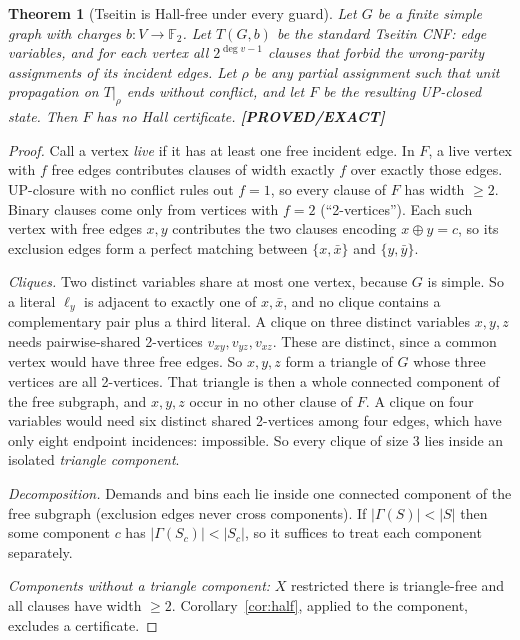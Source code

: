\documentclass[11pt]{article}
\newtheorem{theorem}{Theorem}
\theoremstyle{definition}
\theoremstyle{remark}
\newcommand{\lab}[1]{\textbf{[#1]}}
\newcommand{\F}{\mathbb{F}}
\begin{document}
\begin{theorem}[Tseitin is Hall-free under every guard]\label{thm:tseitin}
Let $G$ be a finite simple graph with charges $b:V\to\F_2$. Let $T(G,b)$ be the standard
Tseitin CNF: edge variables, and for each vertex all $2^{\deg v-1}$ clauses that forbid the
wrong-parity assignments of its incident edges. Let $\rho$ be any partial assignment such that
unit propagation on $T|_\rho$ ends without conflict, and let $F$ be the resulting UP-closed
state. Then $F$ has no Hall certificate. \lab{PROVED/EXACT}
\end{theorem}
\begin{proof}
Call a vertex \emph{live} if it has at least one free incident edge. In $F$, a live vertex with
$f$ free edges contributes clauses of width exactly $f$ over exactly those edges. UP-closure
with no conflict rules out $f=1$, so every clause of $F$ has width $\ge2$. Binary clauses come
only from vertices with $f=2$ (``2-vertices''). Each such vertex with free edges $x,y$
contributes the two clauses encoding $x\oplus y=c$, so its exclusion edges form a perfect
matching between $\{x,\bar x\}$ and $\{y,\bar y\}$.

\emph{Cliques.} Two distinct variables share at most one vertex, because $G$ is simple. So a
literal $\ell_y$ is adjacent to exactly one of $x,\bar x$, and no clique contains a
complementary pair plus a third literal. A clique on three distinct variables $x,y,z$ needs
pairwise-shared 2-vertices $v_{xy},v_{yz},v_{xz}$. These are distinct, since a common vertex
would have three free edges. So $x,y,z$ form a triangle of $G$ whose three vertices are all
2-vertices. That triangle is then a whole connected component of the free subgraph, and $x,y,z$
occur in no other clause of $F$. A clique on four variables would need six distinct shared
2-vertices among four edges, which have only eight endpoint incidences: impossible. So every
clique of size $3$ lies inside an isolated \emph{triangle component}.

\emph{Decomposition.} Demands and bins each lie inside one connected component of the free
subgraph (exclusion edges never cross components). If $|\Gamma(S)|<|S|$ then some component $c$
has $|\Gamma(S_c)|<|S_c|$, so it suffices to treat each component separately.

\emph{Components without a triangle component:} $X$ restricted there is triangle-free and all
clauses have width $\ge2$. Corollary~\ref{cor:half}, applied to the component, excludes a
certificate.


\end{proof}
\end{document}
